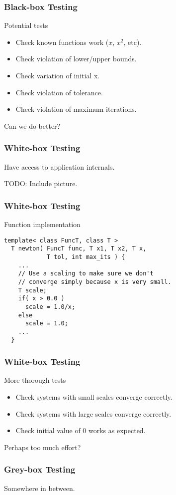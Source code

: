 \begin{frame}[fragile]
  \frametitle{Black-box Testing}
  \begin{block}{Potential tests}
    \begin{itemize}
    \item Check known functions work ($x$, $x^2$, etc).
    \item Check violation of lower/upper bounds.
    \item Check variation of initial x.
    \item Check violation of tolerance.
    \item Check violation of maximum iterations.
    \end{itemize}
  \end{block}
  \pause
  \vspace{1cm}
  {\LARGE\color{Base0A} Can we do better?}
\end{frame}

\begin{frame}
  \frametitle{White-box Testing}
  Have access to application internals.

  TODO: Include picture.
\end{frame}

\begin{frame}[fragile]
  \frametitle{White-box Testing}
  \begin{block}{Function implementation}
    \begin{lstlisting}[style=C]
  template< class FuncT, class T >
  T newton( FuncT func, T x1, T x2, T x,
            T tol, int max_its ) {
    ...
    // Use a scaling to make sure we don't
    // converge simply because x is very small.
    T scale;
    if( x > 0.0 )
      scale = 1.0/x;
    else
      scale = 1.0;
    ...
  }
    \end{lstlisting}
  \end{block}
\end{frame}

\begin{frame}[fragile]
  \frametitle{White-box Testing}
  \begin{block}{More thorough tests}
    \begin{itemize}
    \item Check systems with small scales converge correctly.
    \item Check systems with large scales converge correctly.
    \item Check initial value of 0 works as expected.
    \end{itemize}
  \end{block}
  \pause
  \vspace{1cm}
  {\LARGE\color{Base0A} Perhaps too much effort?}
\end{frame}

\begin{frame}[fragile]
  \frametitle{Grey-box Testing}
  Somewhere in between.
\end{frame}
